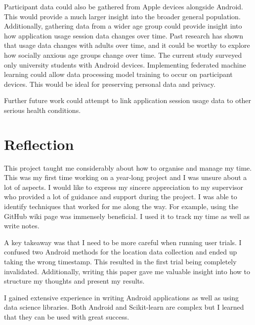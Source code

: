 \documentclass{l4proj}
\begin{document}
Participant data could also be gathered from Apple devices alongside Android. This would provide a much larger insight into the broader general population. Additionally, gathering data from a wider age group could provide insight into how application usage session data changes over time. Past research has shown that usage data changes with adults over time, and it could be worthy to explore how socially anxious age groups change over time. The current study surveyed only university students with Android devices. Implementing federated machine learning could allow data processing model training to occur on participant devices. This would be ideal for preserving personal data and privacy.

Further future work could attempt to link application session usage data to other serious health conditions.

\section{Reflection}
This project taught me considerably about how to organise and manage my time. This was my first time working on a year-long project and I was unsure about a lot of aspects. I would like to express my sincere appreciation to my supervisor who provided a lot of guidance and support during the project. I was able to identify techniques that worked for me along the way. For example, using the GitHub wiki page was immensely beneficial. I used it to track my time as well as write notes. 

A key takeaway was that I need to be more careful when running user trials. I confused two Android methods for the location data collection and ended up taking the wrong timestamp. This resulted in the first trial being completely invalidated. Additionally, writing this paper gave me valuable insight into how to structure my thoughts and present my results.

I gained extensive experience in writing Android applications as well as using data science libraries. Both Android and Scikit-learn are complex but I learned that they can be used with great success.

\end{document}
